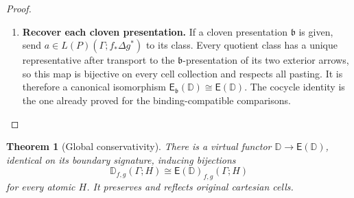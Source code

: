 \documentclass[11pt,reqno]{amsart}
\theoremstyle{plain}
\newtheorem{theorem}{Theorem}[section]
\theoremstyle{definition}
\theoremstyle{remark}
\numberwithin{equation}{section}
\newcommand{\D}{\mathbb D}
\newcommand{\E}{\mathsf E}
\begin{document}
\begin{proof}
\begin{enumerate}
\item \textbf{Recover each cloven presentation.} If a
cloven presentation $\mathfrak b$ is given, send
$a\in L(P)(\Gamma;f_*\Delta g^*)$ to its class. Every quotient class has
a unique representative after transport to the $\mathfrak b$-presentation
of its two exterior arrows, so this map is bijective on every cell
collection and respects all pasting. It is therefore a canonical
isomorphism $\E_{\mathfrak b}(\D)\cong\E(\D)$. The cocycle identity is
the one already proved for the binding-compatible comparisons.\qedhere
\end{enumerate}
\end{proof}

\begin{theorem}[Global conservativity]\label{thm:globalembedding}
There is a virtual functor $\D\to\E(\D)$, identical on its boundary
signature, inducing bijections
\begin{equation}\label{eq:globalembedding}
 \D_{f,g}(\Gamma;H)\cong\E(\D)_{f,g}(\Gamma;H)
\end{equation}
for every atomic $H$. It preserves and reflects original cartesian cells.
\end{theorem}
\end{document}
